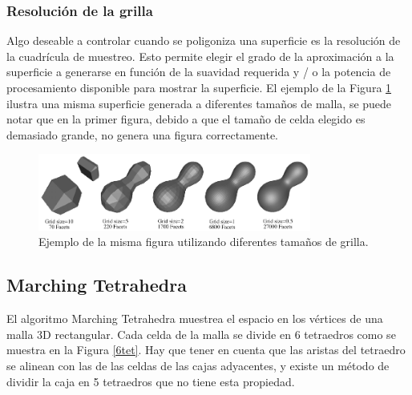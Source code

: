 \documentclass[12pt]{article}
\begin{document}
\subsubsection{Resolución de la grilla}
\noindent Algo deseable a controlar cuando se poligoniza una superficie es la resolución de la cuadrícula de muestreo. Esto permite elegir el grado de la aproximación a la superficie a generarse en función de la suavidad requerida y / o la potencia de procesamiento disponible para mostrar la superficie. El ejemplo de la Figura \ref{mani} ilustra una misma superficie generada a diferentes tamaños de malla, se puede notar que en la primer figura, debido a que el tamaño de celda elegido es demasiado grande, no genera una figura correctamente.
\begin{figure}[h!]
\includegraphics[width=0.8\textwidth,center]{marchingcubes4.png}
\caption{Ejemplo de la misma figura utilizando diferentes tamaños de grilla.}
\label{mani}
\end{figure}

\subsection{Marching Tetrahedra}
\noindent El algoritmo Marching Tetrahedra\cite{marching}\cite{marchingt} muestrea el espacio en los vértices de una malla 3D rectangular. Cada celda de la malla se divide en 6 tetraedros como se muestra en la Figura \ref{6tet}. Hay que tener en cuenta que las aristas del tetraedro se alinean con las de las celdas de las cajas adyacentes, y existe un método de dividir la caja en 5 tetraedros que no tiene esta propiedad.
\end{document}
